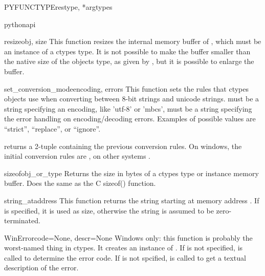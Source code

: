 \begin{funcdesc}{PYFUNCTYPE}{restype, *argtypes}
\end{funcdesc}

\begin{funcdesc}{pythonapi}{}
\end{funcdesc}

\begin{funcdesc}{resize}{obj, size}
This function resizes the internal memory buffer of , which
must be an instance of a ctypes type.  It is not possible to make the
buffer smaller than the native size of the objects type, as given by
, but it is possible to enlarge the buffer.
\end{funcdesc}

\begin{funcdesc}{set_conversion_mode}{encoding, errors}
This function sets the rules that ctypes objects use when converting
between 8-bit strings and unicode strings.   must be a
string specifying an encoding, like 'utf-8' or 'mbcs', 
must be a string specifying the error handling on encoding/decoding
errors.  Examples of possible values are ``strict'', ``replace'', or
``ignore''.

 returns a 2-tuple containing the previous
conversion rules.  On windows, the initial conversion rules are
, on other systems .
\end{funcdesc}

\begin{funcdesc}{sizeof}{obj_or_type}
Returns the size in bytes of a ctypes type or instance memory buffer.
Does the same as the C sizeof() function.
\end{funcdesc}

\begin{funcdesc}{string_at}{address}
This function returns the string starting at memory address
.  If  is specified, it is used as size,
otherwise the string is assumed to be zero-terminated.
\end{funcdesc}

\begin{funcdesc}{WinError}{code=None, descr=None}
Windows only: this function is probably the worst-named thing in
ctypes.  It creates an instance of .  If 
is not specified,  is called to determine the error
code.  If  is not spcified,  is called to
get a textual description of the error.
\end{funcdesc}

